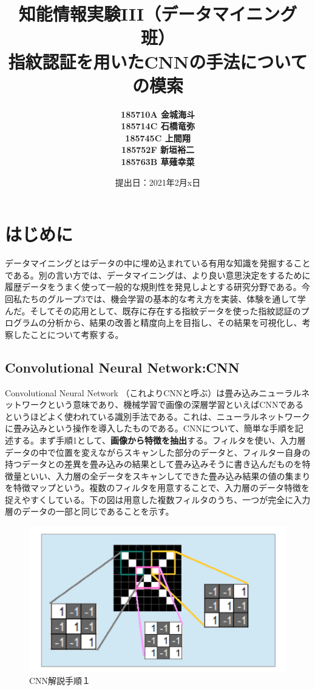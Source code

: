 \documentclass[a4paper, 11pt, titlepage]{jsarticle}
\title{知能情報実験III（データマイニング班）\\指紋認証を用いたCNNの手法についての模索}
\author{\textbf{185710A 金城海斗}\\
\textbf{185714C 石橋竜弥}\\
 \textbf{185745C 上間翔}\\
 \textbf{185752F 新垣裕二}\\
 \textbf{185763B 草薙幸菜}}
\date{提出日：2021年2月x日}
\begin{document}
\maketitle
\tableofcontents
\clearpage


\section{はじめに}
データマイニングとはデータの中に埋め込まれている有用な知識を発掘することである。別の言い方では、データマイニングは、より良い意思決定をするために履歴データをうまく使って一般的な規則性を発見しよとする研究分野である。今回私たちのグループ3では、機会学習の基本的な考え方を実装、体験を通して学んだ。そしてその応用として、既存に存在する指紋データを使った指紋認証のプログラムの分析から、結果の改善と精度向上を目指し、その結果を可視化し、考察したことについて考察する。

\subsection{Convolutional Neural Network:CNN}
Convolutional Neural Network （これよりCNNと呼ぶ）は畳み込みニューラルネットワークという意味であり、機械学習で画像の深層学習といえばCNNであるというほどよく使われている識別手法である。これは、ニューラルネットワークに畳み込みという操作を導入したものである。CNNについて、簡単な手順を記述する。まず手順1として、\textbf{画像から特徴を抽出}する。フィルタを使い、入力層データの中で位置を変えながらスキャンした部分のデータと、フィルター自身の持つデータとの差異を畳み込みの結果として畳み込みそうに書き込んだものを特徴量といい、入力層の全データをスキャンしてできた畳み込み結果の値の集まりを特徴マップという。複数のフィルタを用意することで、入力層のデータ特徴を捉えやすくしている。下の図は用意した複数フィルタのうち、一つが完全に入力層のデータの一部と同じであることを示す。

\begin{figure}[h]
  \centering
  \includegraphics[scale=0.4]{cnn1.png}
  \caption{CNN解説手順１}
  \label{cnn}
\end{figure}
\end{document}
